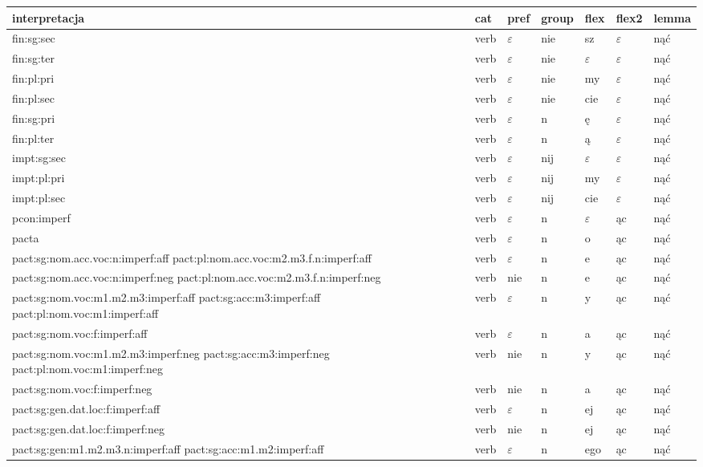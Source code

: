 \documentclass{article}
\begin{document}
\begin{longtable}{p{7cm}|l|l|l|l|l|l}
interpretacja & cat & pref & group & flex & flex2 & lemma\\
\hline
fin:sg:sec & verb & $\varepsilon$ & nie & sz & $\varepsilon$ & nąć\\
fin:sg:ter & verb & $\varepsilon$ & nie & $\varepsilon$ & $\varepsilon$ & nąć\\
fin:pl:pri & verb & $\varepsilon$ & nie & my & $\varepsilon$ & nąć\\
fin:pl:sec & verb & $\varepsilon$ & nie & cie & $\varepsilon$ & nąć\\
fin:sg:pri & verb & $\varepsilon$ & n & ę & $\varepsilon$ & nąć\\
fin:pl:ter & verb & $\varepsilon$ & n & ą & $\varepsilon$ & nąć\\
impt:sg:sec & verb & $\varepsilon$ & nij & $\varepsilon$ & $\varepsilon$ & nąć\\
impt:pl:pri & verb & $\varepsilon$ & nij & my & $\varepsilon$ & nąć\\
impt:pl:sec & verb & $\varepsilon$ & nij & cie & $\varepsilon$ & nąć\\
pcon:imperf & verb & $\varepsilon$ & n & $\varepsilon$ & ąc & nąć\\
pacta & verb & $\varepsilon$ & n & o & ąc & nąć\\
pact:sg:nom.acc.voc:n:imperf:aff pact:pl:nom.acc.voc:m2.m3.f.n:imperf:aff & verb & $\varepsilon$ & n & e & ąc & nąć\\
pact:sg:nom.acc.voc:n:imperf:neg pact:pl:nom.acc.voc:m2.m3.f.n:imperf:neg & verb & nie & n & e & ąc & nąć\\
pact:sg:nom.voc:m1.m2.m3:imperf:aff pact:sg:acc:m3:imperf:aff pact:pl:nom.voc:m1:imperf:aff & verb & $\varepsilon$ & n & y & ąc & nąć\\
pact:sg:nom.voc:f:imperf:aff & verb & $\varepsilon$ & n & a & ąc & nąć\\
pact:sg:nom.voc:m1.m2.m3:imperf:neg pact:sg:acc:m3:imperf:neg pact:pl:nom.voc:m1:imperf:neg & verb & nie & n & y & ąc & nąć\\
pact:sg:nom.voc:f:imperf:neg & verb & nie & n & a & ąc & nąć\\
pact:sg:gen.dat.loc:f:imperf:aff & verb & $\varepsilon$ & n & ej & ąc & nąć\\
pact:sg:gen.dat.loc:f:imperf:neg & verb & nie & n & ej & ąc & nąć\\
pact:sg:gen:m1.m2.m3.n:imperf:aff pact:sg:acc:m1.m2:imperf:aff & verb & $\varepsilon$ & n & ego & ąc & nąć\\

\end{longtable}
\end{document}

